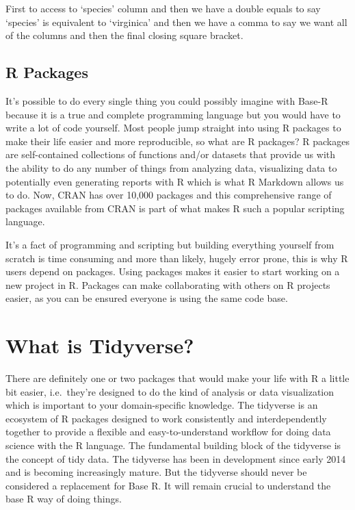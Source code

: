 \documentclass[
]{article}
\begin{document}
First to access to `species' column and then we have a double equals to say `species' is equivalent to `virginica' and then we have a comma to say we want all of the columns and then the final closing square bracket.

\hypertarget{r-packages}{%
\subsection{R Packages}\label{r-packages}}

It's possible to do every single thing you could possibly imagine with Base-R because it is a true and complete programming language but you would have to write a lot of code yourself. Most people jump straight into using R packages to make their life easier and more reproducible, so what are R packages? R packages are self-contained collections of functions and/or datasets that provide us with the ability to do any number of things from analyzing data, visualizing data to potentially even generating reports with R which is what R Markdown allows us to do. Now, CRAN has over 10,000 packages and this comprehensive range of packages available from CRAN is part of what makes R such a popular scripting language.

It's a fact of programming and scripting but building everything yourself from scratch is time consuming and more than likely, hugely error prone, this is why R users depend on packages. Using packages makes it easier to start working on a new project in R. Packages can make collaborating with others on R projects easier, as you can be ensured everyone is using the same code base.

\hypertarget{what-is-tidyverse}{%
\section{What is Tidyverse?}\label{what-is-tidyverse}}

There are definitely one or two packages that would make your life with R a little bit easier, i.e.~they're designed to do the kind of analysis or data visualization which is important to your domain-specific knowledge. The tidyverse is an ecosystem of R packages designed to work consistently and interdependently together to provide a flexible and easy-to-understand workflow for doing data science with the R language. The fundamental building block of the tidyverse is the concept of tidy data. The tidyverse has been in development since early 2014 and is becoming increasingly mature. But the tidyverse should never be considered a replacement for Base R. It will remain crucial to understand the base R way of doing things.
\end{document}
